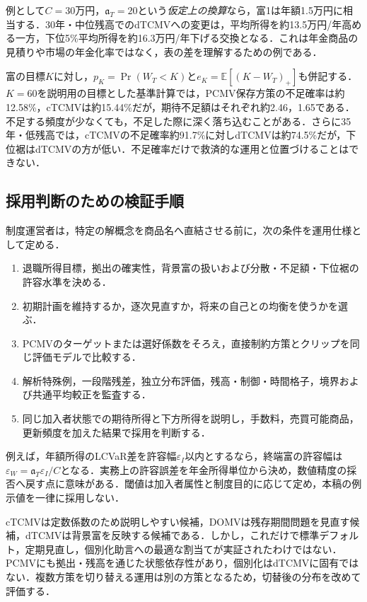 \documentclass[10pt,a4paper]{article}
\numberwithin{equation}{section}
\numberwithin{table}{section}
\numberwithin{figure}{section}
\theoremstyle{plain}
\theoremstyle{definition}
\newcommand{\E}{\mathbb{E}}
\begin{document}
例として$C=30$万円，$\mathfrak a_T=20$という\emph{仮定上の換算}なら，富1は年額1.5万円に相当する．30年・中位残高でのdTCMVへの変更は，平均所得を約13.5万円/年高める一方，下位5\%平均所得を約16.3万円/年下げる交換となる．これは年金商品の見積りや市場の年金化率ではなく，表の差を理解するための例である．

富の目標$K$に対し，$p_K=\Pr(W_T<K)$と$e_K=\E[(K-W_T)_+]$も併記する．$K=60$を説明用の目標とした基準計算では，PCMV保存方策の不足確率は約12.58\%，cTCMVは約15.44\%だが，期待不足額はそれぞれ約2.46，1.65である．不足する頻度が少なくても，不足した際に深く落ち込むことがある．さらに35年・低残高では，cTCMVの不足確率約91.7\%に対しdTCMVは約74.5\%だが，下位裾はdTCMVの方が低い．不足確率だけで救済的な運用と位置づけることはできない．

\subsection{採用判断のための検証手順}
\label{sec:practice}
制度運営者は，特定の解概念を商品名へ直結させる前に，次の条件を運用仕様として定める．
\begin{enumerate}[leftmargin=2em,itemsep=3pt]
\item 退職所得目標，拠出の確実性，背景富の扱いおよび分散・不足額・下位裾の許容水準を決める．
\item 初期計画を維持するか，逐次見直すか，将来の自己との均衡を使うかを選ぶ．
\item PCMVのターゲットまたは選好係数をそろえ，直接制約方策とクリップを同じ評価モデルで比較する．
\item 解析特殊例，一段階残差，独立分布評価，残高・制御・時間格子，境界および共通平均較正を監査する．
\item 同じ加入者状態での期待所得と下方所得を説明し，手数料，売買可能商品，更新頻度を加えた結果で採用を判断する．
\end{enumerate}
例えば，年額所得のLCVaR差を許容幅$\varepsilon_I$以内とするなら，終端富の許容幅は$\varepsilon_W=\mathfrak a_T\varepsilon_I/C$となる．実務上の許容誤差を年金所得単位から決め，数値精度の採否へ戻す点に意味がある．閾値は加入者属性と制度目的に応じて定め，本稿の例示値を一律に採用しない．

cTCMVは定数係数のため説明しやすい候補，DOMVは残存期間問題を見直す候補，dTCMVは背景富を反映する候補である．しかし，これだけで標準デフォルト，定期見直し，個別化助言への最適な割当てが実証されたわけではない．PCMVにも拠出・残高を通じた状態依存性があり，個別化はdTCMVに固有ではない．複数方策を切り替える運用は別の方策となるため，切替後の分布を改めて評価する．
\end{document}
